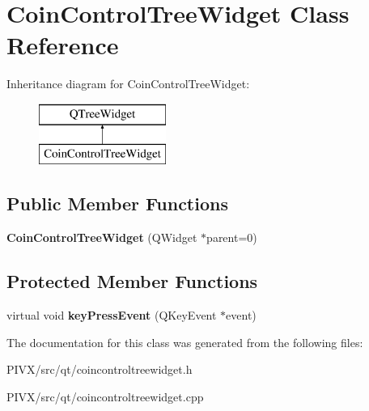 \hypertarget{class_coin_control_tree_widget}{}\section{Coin\+Control\+Tree\+Widget Class Reference}
\label{class_coin_control_tree_widget}
Inheritance diagram for Coin\+Control\+Tree\+Widget\+:\begin{figure}[H]
\begin{center}
\leavevmode
\includegraphics[height=2.000000cm]{class_coin_control_tree_widget}
\end{center}
\end{figure}
\subsection*{Public Member Functions}
\begin{DoxyCompactItemize}
\item 
\mbox{\label{class_coin_control_tree_widget_a426fcbff6c4a6707d50148b281b2dc3f}} 
{\bfseries Coin\+Control\+Tree\+Widget} (Q\+Widget $\ast$parent=0)
\end{DoxyCompactItemize}
\subsection*{Protected Member Functions}
\begin{DoxyCompactItemize}
\item 
\mbox{\label{class_coin_control_tree_widget_a214c041952383bd6b8cb38fbccdd5c8c}} 
virtual void {\bfseries key\+Press\+Event} (Q\+Key\+Event $\ast$event)
\end{DoxyCompactItemize}


The documentation for this class was generated from the following files\+:\begin{DoxyCompactItemize}
\item 
P\+I\+V\+X/src/qt/coincontroltreewidget.\+h\item 
P\+I\+V\+X/src/qt/coincontroltreewidget.\+cpp\end{DoxyCompactItemize}
